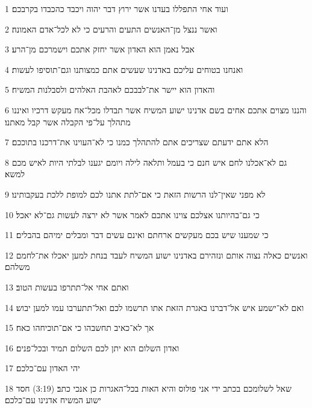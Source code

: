 \par 1 ועוד אחי התפללו בעדנו אשר ירוץ דבר יהוה ויכבד כהכבדו בקרבכם׃
\par 2 ואשר ננצל מן־האנשים התעים והרעים כי לא לכל־אדם האמונה׃
\par 3 אבל נאמן הוא האדון אשר יחזק אתכם וישמרכם מן־הרע׃
\par 4 ואנחנו בטוחים עליכם באדנינו שעשים אתם כמצותנו וגם־תוסיפו לעשות׃
\par 5 והאדון הוא יישר את־לבבכם לאהבת האלהים ולסבלנות המשיח׃
\par 6 והננו מצוים אתכם אחים בשם אדנינו ישוע המשיח אשר תבדלו מכל־אח מעקש דרכיו ואיננו מתהלך על־פי הקבלה אשר קבל מאתנו׃
\par 7 הלא אתם ידעתם שצריכים אתם להתהלך כמנו כי לא־העוינו את־דרכנו בתוככם׃
\par 8 גם לא־אכלנו לחם איש חנם כי בעמל ותלאה לילה ויומם יגענו לבלתי היות לאיש מכם למשא׃
\par 9 לא מפני שאין־לנו הרשות הזאת כי אם־לתת אתנו לכם למופת ללכת בעקבותינו׃
\par 10 כי גם־בהיותנו אצלכם צוינו אתכם לאמר אשר לא ירצה לעשות גם־לא יאכל׃
\par 11 כי שמענו שיש בכם מעקשים ארחתם ואינם עשים דבר ומבלים ימיהם בהבלים׃
\par 12 ואנשים כאלה נצוה אותם ונזהירם באדנינו ישוע המשיח לעבד בנחת למען יאכלו את־לחמם משלהם׃
\par 13 ואתם אחי אל־תתרפו בעשות הטוב׃
\par 14 ואם לא־ישמע איש אל־דברנו באגרת הזאת אתו תרשמו לכם ואל־תתערבו עמו למען יבוש׃
\par 15 אך לא־כאיב תחשבהו כי אם־תוכיחהו כאח׃
\par 16 ואדון השלום הוא יתן לכם השלום תמיד ובכל־פנים׃
\par 17 יהי האדון עם־כלכם׃
\par 18 שאל לשלומכם בכתב ידי אני פולוס והיא האות בכל־האגרות כן אנכי כתב׃ (3:19) חסד ישוע המשיח אדנינו עם־כלכם׃


